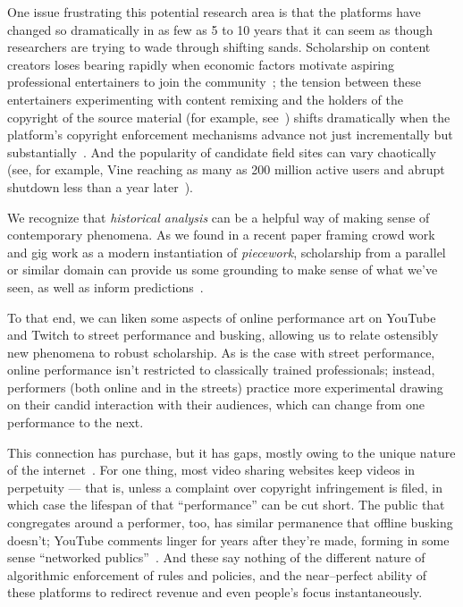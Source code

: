\documentclass[10pt]{article}
\newcommand{\topic}[1]{{\color{Blue}#1}}
\renewcommand{\topic}[1]{{#1}}
\begin{document}
\topic{One issue frustrating this potential research area is that
the platforms have changed so dramatically in as few as 5 to 10 years that
it can seem as though researchers are trying to wade through shifting sands.}
Scholarship on content creators loses bearing rapidly when
economic factors motivate aspiring professional entertainers to join the community~\cite{Hamilton:2014:STF:2611105.2557048};
the tension between these entertainers experimenting with content remixing and
the holders of the copyright of the source material
(for example, see~\cite{Hilderbrand48})
shifts dramatically when
the platform's copyright enforcement mechanisms advance
not just incrementally but substantially~\cite{kim2012institutionalization}.
And the popularity of candidate field sites can vary chaotically
(see, for example, Vine reaching as many as 200 million active users and
abrupt shutdown less than a year later~\cite{vineDecline}).

\topic{We recognize that \textit{historical analysis}
can be a helpful way of
making sense of contemporary phenomena.}
As we found in a recent paper framing crowd work and gig work as a modern instantiation of \textit{piecework},
scholarship from a parallel or similar domain can
provide us some grounding to make sense of what we've seen, as well as inform predictions~\cite{pieceworkCrowdworkGigwork}.

\topic{To that end, we can liken some aspects of online performance art on YouTube and Twitch
to street performance and busking,
allowing us to relate ostensibly new phenomena to robust scholarship.}
As is the case with street performance,
online performance isn't restricted to classically trained professionals;
instead, performers (both online and in the streets) practice more experimental 
drawing on their candid interaction with their audiences,
which can change from one performance to the next.

\topic{This connection has purchase, but it has gaps, mostly owing to the unique nature of the internet~\cite{miller2011understanding}.}
For one thing, most video sharing websites keep videos
in perpetuity
--- that is, unless a complaint over copyright infringement is filed, in which case the lifespan of that ``performance'' can be cut short.
The public that congregates around a performer, too, has similar permanence that offline busking doesn't;
YouTube comments linger for years after they're made, forming in some sense ``networked publics''~\cite{boyd2007youth}.
And these say nothing of the different nature of algorithmic enforcement of rules and policies, and
the near--perfect ability of these platforms to redirect revenue and even people's focus instantaneously.
\end{document}
